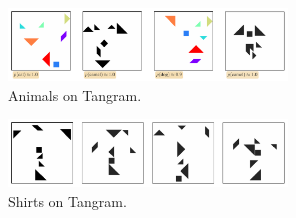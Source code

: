 
\begin{figure}[H]
    \centering
    \includegraphics[width=0.66\textwidth]{images/curation_faces_all.pdf}
    \caption{Animals on Tangram.}
    \label{fig:curation_animals}
\end{figure}

\begin{figure}[H]
    \centering
    \includegraphics[width=0.66\textwidth]{images/curation_shirt_all.pdf}
    \caption{Shirts on Tangram.}
    \label{fig:curation_shirt_all}
\end{figure}

